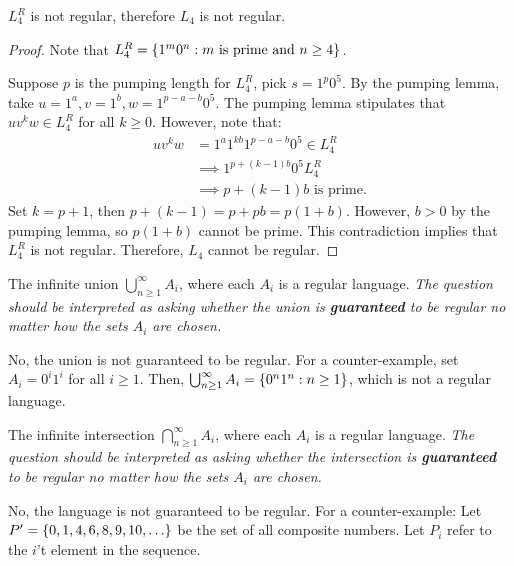 \begin{problem}
\begin{enumalph}
\begin{Answer}
        \step
        \begin{claim}
          $L_4^R$ is not regular, therefore $L_4$ is not regular.

          \begin{proof}
            Note that $L_4^R = \left\{1^m0^n : \text{$m$ is prime and $n \ge 4$}\right\}$.

            \step
            Suppose $p$ is the pumping length for $L_4^R$, pick $s = 1^p0^5$.
            By the pumping lemma, take $u = 1^a, v = 1^b, w = 1^{p-a-b}0^5$.
            The pumping lemma stipulates that $uv^kw \in L_4^R$ for all $k \geq 0$.
            However, note that:
            \begin{align*}
              uv^kw &= 1^a1^{kb}1^{p-a-b}0^5 \in L_4^R\\
              &\implies 1^{p+(k-1)b}0^5 L_4^R\\
              &\implies p+(k-1)b \text{ is prime.}
            \end{align*}
            Set $k = p+1$, then $p+(k-1) = p + pb = p(1+b)$.
            However, $b > 0$ by the pumping lemma, so $p(1+b)$ cannot be prime.
            This contradiction implies that $L_4^R$ is not regular.
            Therefore, $L_4$ cannot be regular.
          \end{proof}
        \end{claim}
      \end{Answer}
    \item The infinite union $\bigcup_{n \geq 1}^\infty A_i$, where each $A_i$
      is a regular language.
      \emph{
        The question should be interpreted as asking
        whether the union is \textbf{guaranteed} to be regular
        no matter how the sets $A_i$ are chosen.
      }
      \begin{Answer}
        No, the union is not guaranteed to be regular.
        For a counter-example, set $A_i = 0^i1^i$ for all $i \geq 1$.
        Then, $\bigcup_{n \geq 1}^\infty A_i = \left\{0^n1^n : n \ge 1\right\}$,
        which is not a regular language.
      \end{Answer}
    \item The infinite intersection $\bigcap_{n \geq 1}^\infty A_i$, where each $A_i$
      is a regular language.
      \emph{
        The question should be interpreted as asking
        whether the intersection is \textbf{guaranteed} to be regular
        no matter how the sets $A_i$ are chosen.
      }
      \begin{Answer}
        No, the language is not guaranteed to be regular.
        For a counter-example:
        Let $P' = \left\{0, 1, 4, 6, 8, 9, 10, \ldots\right\}$ be the set of all composite numbers.
        Let $P_i$ refer to the $i$'t element in the sequence.
        

\end{Answer}
\end{enumalph}
\end{problem}
